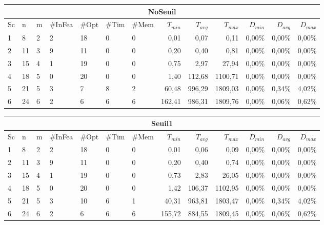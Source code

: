 \begin{table}[h]
    \centering
    \begin{tabular}{|l|l|l|l|l|l|l|r|r|r|r|r|r|}
    	\hline
    	\multicolumn{13}{|c|}{NoSeuil}\\ \hline
Sc &n	&m	&\#InFea	&\#Opt	&\#Tim &\#Mem	&$T_{min}$ & $T_{avg}$	& $T_{max}$ & $D_{min}$ & $D_{avg}$	& $D_{max}$ \\ \hline
1&	8 &	2&	2	        &18	&0	&0	&0,01	&0,07	&0,11	&0,00\%&	0,00\%&	0,00\%    \\ \hline
2&	11&	3&	9	        &11	&0	&0	&0,20	&0,40	&0,81	&0,00\%&	0,00\%&	0,00\%     \\ \hline
3&	15&	4&	1	        &19	&0	&0	&0,75	&2,97	&27,94	&0,00\%&	0,00\%&	0,00\%  \\ \hline
4 &	18	&5&	0	        &20	&0	&0	&1,40	&112,68	&1100,71	&0,00\%&	0,00\%&	0,00\% \\ \hline
5 &	21	&5	&3	        &7	&8	&2	&60,48	&996,29	&1809,03	&0,00\%&	0,34\%&	4,02\% \\ \hline
6 &	24	&6&	2	        &6	&6	&6	&162,41	&986,31	&1809,76	&0,00\%&	0,06\%&	0,62\% \\ \hline
    \end{tabular}
    \label{tab_cut2_tab2}
\medskip \par
    \begin{tabular}{|l|l|l|l|l|l|l|r|r|r|r|r|r|}
    	\hline
    	\multicolumn{13}{|c|}{Seuil1}\\ \hline
Sc &n	&m	&\#InFea	&\#Opt	&\#Tim &\#Mem	&$T_{min}$ & $T_{avg}$	& $T_{max}$ & $D_{min}$ & $D_{avg}$	& $D_{max}$ \\ \hline
1&	8 &	2&	2	        &18	&0	&0	&0,01	&0,06	&0,09	&0,00\%	&0,00\%	&0,00\%\\ \hline
2&	11&	3&	9	        &11	&0	&0	&0,20	&0,40	&0,74	&0,00\%	&0,00\%	&0,00\% \\ \hline
3&	15&	4&	1	        &19	&0	&0	&0,73	&2,83	&26,05	&0,00\%	&0,00\%	&0,00\% \\ \hline
4 &	18	&5	&0	        &20	&0	&0	&1,42	&106,37	&1102,95	&0,00\%	&0,00\%	&0,00\% \\ \hline
5 &	21	&5	&3	        &10	&6	&1	&40,31	&963,81	&1803,47	&0,00\%	&0,34\%	&4,02\% \\ \hline
6 &	24	&6	&2	        &6	&6	&6	&155,72	&884,55	&1809,45	&0,00\%	&0,06\%	&0,62\% \\ \hline
    \end{tabular}
    \label{tab_cut2_s1_tab2}

\end{table}
